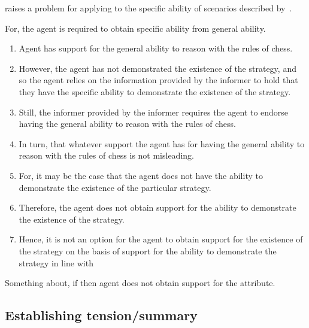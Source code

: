 \begin{note}
  \nI{} raises a problem for applying \AR{} to the specific ability of scenarios described by~\eA{}.

  For, the agent is required to obtain specific ability from general ability.
  \begin{enumerate}
  \item Agent has support for the general ability to reason with the rules of chess.
  \item However, the agent has not demonstrated the existence of the strategy, and so the agent relies on the information provided by the informer to hold that they have the specific ability to demonstrate the existence of the strategy.
  \item Still, the informer provided by the informer requires the agent to endorse having the general ability to reason with the rules of chess.
  \item In turn, that whatever support the agent has for having the general ability to reason with the rules of chess is not misleading.
  \item For, it may be the case that the agent does not have the ability to demonstrate the existence of the particular strategy.
  \item Therefore, the agent does not obtain support for the ability to demonstrate the existence of the strategy.
  \item Hence, it is not an option for the agent to obtain support for the existence of the strategy on the basis of support for the ability to demonstrate the strategy in line with \AR{}
  \end{enumerate}
\end{note}



\begin{note}
  Something about, if \eA{} then agent does not obtain support for the attribute.
\end{note}

\subsection{Establishing tension/summary}
\label{sec:establishing-tension}

